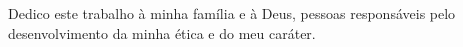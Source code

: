 
\renewcommand{\dedicatorianame}{DEDICATÓRIA}

\begin{dedicatoria}

Dedico este trabalho à minha família e à Deus, pessoas responsáveis pelo desenvolvimento da minha ética e do meu caráter.

\end{dedicatoria}
